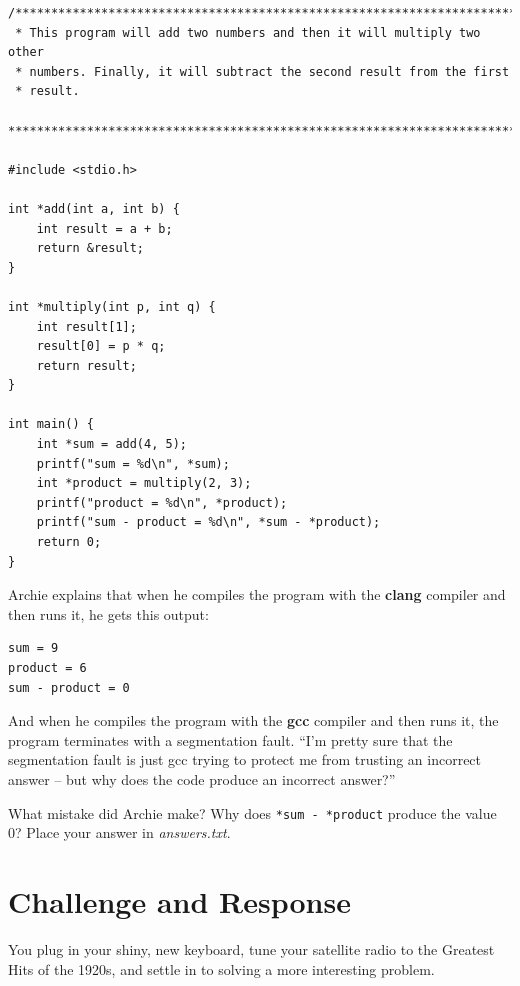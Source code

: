 \begin{lstlisting}
/***********************************************************************
 * This program will add two numbers and then it will multiply two other
 * numbers. Finally, it will subtract the second result from the first
 * result.
 ***********************************************************************/

#include <stdio.h>

int *add(int a, int b) {
    int result = a + b;
    return &result;
}

int *multiply(int p, int q) {
    int result[1];
    result[0] = p * q;
    return result;
}

int main() {
    int *sum = add(4, 5);
    printf("sum = %d\n", *sum);
    int *product = multiply(2, 3);
    printf("product = %d\n", *product);
    printf("sum - product = %d\n", *sum - *product);
    return 0;
}
\end{lstlisting}

Archie explains that when he compiles the program with the \textbf{clang}
compiler and then runs it, he gets this output:

\begin{verbatim}
sum = 9
product = 6
sum - product = 0
\end{verbatim}

And when he compiles the program with the \textbf{gcc} compiler and then runs
it, the program terminates with a segmentation fault. ``I'm pretty sure that
the segmentation fault is just gcc trying to protect me from trusting an
incorrect answer -- but why does the code produce an incorrect answer?''

What mistake did Archie make? Why does \lstinline{*sum - *product} produce the
value 0? Place your answer in \textit{answers.txt}.


\section{Challenge and Response}

You plug in your shiny, new keyboard, tune your satellite radio to the
Greatest Hits of the 1920s, and settle in to solving a more interesting problem.

